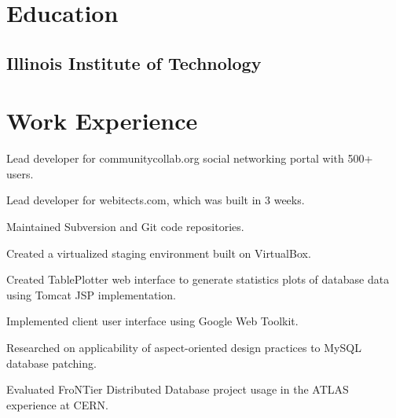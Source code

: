 \documentclass{resume}
\begin{document}
\author{Dmitry Ratnikov}
\maketitle

\section{Education}

\subsection{Illinois Institute of Technology}


\section{Work Experience}

\begin{compactitem}
  \item Lead developer for communitycollab.org social networking portal with 500+ users.
  \item Lead developer for webitects.com, which was built in 3 weeks.
  \item Maintained Subversion and Git code repositories.
  \item Created a virtualized staging environment built on VirtualBox.
\end{compactitem}

\begin{compactitem}
  \item Created TablePlotter web interface to generate statistics plots of database data using Tomcat JSP implementation.
  \item Implemented client user interface using Google Web Toolkit.
\end{compactitem}

\begin{compactitem}
  \item Researched on applicability of aspect-oriented design practices to MySQL database patching.
  \item Evaluated FroNTier Distributed Database project usage in the ATLAS experience at CERN.
\end{compactitem}
\end{document}
